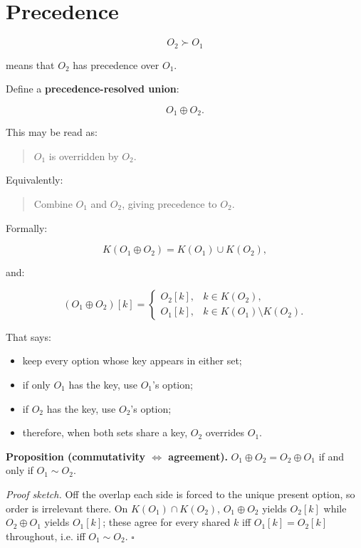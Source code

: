 \documentclass[11pt]{article}
\begin{document}
\section{Precedence}

\[
O_2 \succ O_1
\]

means that \(O_2\) has precedence over \(O_1\).

Define a \textbf{precedence-resolved union}:

\[
O_1 \oplus O_2.
\]

This may be read as:

\begin{quote}
\(O_1\) is overridden by \(O_2\).
\end{quote}

Equivalently:

\begin{quote}
Combine \(O_1\) and \(O_2\), giving precedence to \(O_2\).
\end{quote}

Formally:

\[
K(O_1 \oplus O_2) = K(O_1) \cup K(O_2),
\]

and:

\[
(O_1 \oplus O_2)[k]
=
\begin{cases}
O_2[k], & k \in K(O_2), \\
O_1[k], & k \in K(O_1) \setminus K(O_2).
\end{cases}
\]

That says:

\begin{itemize}
    \item keep every option whose key appears in either set;
    \item if only \(O_1\) has the key, use \(O_1\)'s option;
    \item if \(O_2\) has the key, use \(O_2\)'s option;
    \item therefore, when both sets share a key, \(O_2\) overrides \(O_1\).
\end{itemize}

\textbf{Proposition (commutativity \(\iff\) agreement).}
\(O_1 \oplus O_2 = O_2 \oplus O_1\) if and only if \(O_1 \sim O_2\).

\emph{Proof sketch.} Off the overlap each side is forced to the unique present option, so order is irrelevant there. On \(K(O_1) \cap K(O_2)\), \(O_1 \oplus O_2\) yields \(O_2[k]\) while \(O_2 \oplus O_1\) yields \(O_1[k]\); these agree for every shared \(k\) iff \(O_1[k] = O_2[k]\) throughout, i.e. iff \(O_1 \sim O_2\). \(\square\)
\end{document}
